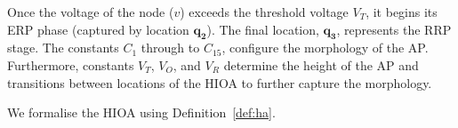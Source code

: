 Once the voltage of the node ($v$) exceeds the threshold voltage
$V_{T}$, it begins its \ac{ERP} phase (captured by location
$\mathbf{q_2}$). The final location, $\mathbf{q_3}$, represents the
\ac{RRP} stage. The constants $C_1$ through to $C_{15}$, configure the
morphology of the \ac{AP}. Furthermore, constants $V_T$, $V_O$, and
$V_R$ determine the height of the \ac{AP} and transitions between
locations of the \ac{HIOA} to further capture the morphology.



We formalise the \ac{HIOA} using Definition~\ref{def:ha}.


